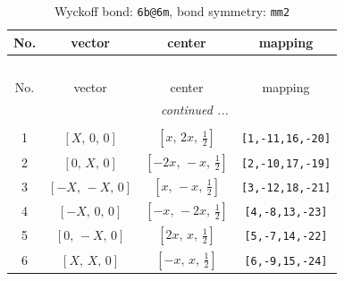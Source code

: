 \documentclass[fleqn,8pt]{jsarticle}
\begin{document}
\begin{longtable}{cccc}
\caption{Wyckoff bond: {\tt 6b@6m}, bond symmetry: {\tt mm2}}
 \\
 \hline \hline
No. & vector & center & mapping \\ \hline \endfirsthead

\multicolumn{3}{l}{\tablename\ \thetable{}} \\
 \hline \hline
No. & vector & center & mapping \\ \hline \endhead

 \hline \hline
\multicolumn{3}{r}{\footnotesize\it continued ...} \\ \endfoot

 \hline \hline
\multicolumn{3}{r}{} \\ \endlastfoot

1 & $\left[ X,\, 0,\, 0 \right]$ & $\left[ x,\, 2 x,\, \frac{1}{2} \right]$ & {\tt [1,-11,16,-20]} \\ \hline
2 & $\left[ 0,\, X,\, 0 \right]$ & $\left[ - 2 x,\, - x,\, \frac{1}{2} \right]$ & {\tt [2,-10,17,-19]} \\ \hline
3 & $\left[ - X,\, - X,\, 0 \right]$ & $\left[ x,\, - x,\, \frac{1}{2} \right]$ & {\tt [3,-12,18,-21]} \\ \hline
4 & $\left[ - X,\, 0,\, 0 \right]$ & $\left[ - x,\, - 2 x,\, \frac{1}{2} \right]$ & {\tt [4,-8,13,-23]} \\ \hline
5 & $\left[ 0,\, - X,\, 0 \right]$ & $\left[ 2 x,\, x,\, \frac{1}{2} \right]$ & {\tt [5,-7,14,-22]} \\ \hline
6 & $\left[ X,\, X,\, 0 \right]$ & $\left[ - x,\, x,\, \frac{1}{2} \right]$ & {\tt [6,-9,15,-24]} \\
\end{longtable}
\renewcommand{\arraystretch}{1.2}
\end{document}

